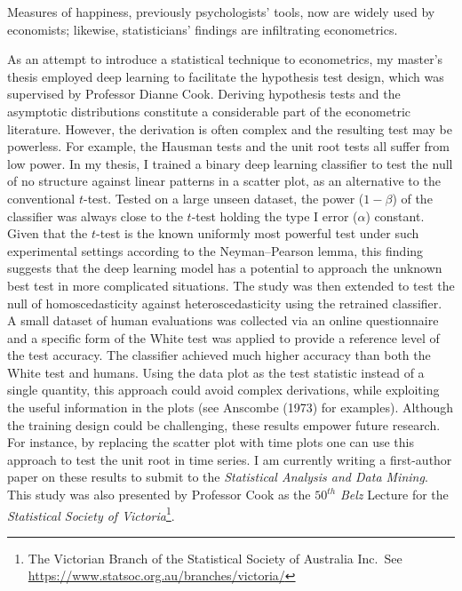 \documentclass[12pt,]{article}
\let\rmarkdownfootnote\footnote%
\def\footnote{\protect\rmarkdownfootnote}
\begin{document}
Measures of happiness, previously psychologists' tools, now are widely
used by economists; likewise, statisticians' findings are infiltrating
econometrics.

As an attempt to introduce a statistical technique to econometrics, my
master's thesis employed deep learning to facilitate the hypothesis test
design, which was supervised by Professor Dianne Cook. Deriving
hypothesis tests and the asymptotic distributions constitute a
considerable part of the econometric literature. However, the derivation
is often complex and the resulting test may be powerless. For example,
the Hausman tests and the unit root tests all suffer from low power. In
my thesis, I trained a binary deep learning classifier to test the null
of no structure against linear patterns in a scatter plot, as an
alternative to the conventional \(t\)-test. Tested on a large unseen
dataset, the power (\(1-\beta\)) of the classifier was always close to
the \(t\)-test holding the type I error (\(\alpha\)) constant. Given
that the \(t\)-test is the known uniformly most powerful test under such
experimental settings according to the Neyman--Pearson lemma, this
finding suggests that the deep learning model has a potential to
approach the unknown best test in more complicated situations. The study
was then extended to test the null of homoscedasticity against
heteroscedasticity using the retrained classifier. A small dataset of
human evaluations was collected via an online questionnaire and a
specific form of the White test was applied to provide a reference level
of the test accuracy. The classifier achieved much higher accuracy than
both the White test and humans. Using the data plot as the test
statistic instead of a single quantity, this approach could avoid
complex derivations, while exploiting the useful information in the
plots (see Anscombe (1973) for examples). Although the training design
could be challenging, these results empower future research. For
instance, by replacing the scatter plot with time plots one can use this
approach to test the unit root in time series. I am currently writing a
first-author paper on these results to submit to the \emph{Statistical
Analysis and Data Mining}. This study was also presented by Professor
Cook as the \(50^{th}\) \emph{Belz} Lecture for the \emph{Statistical
Society of Victoria}\footnote{The Victorian Branch of the Statistical
  Society of Australia Inc.~See
  \url{https://www.statsoc.org.au/branches/victoria/}}.
\end{document}
